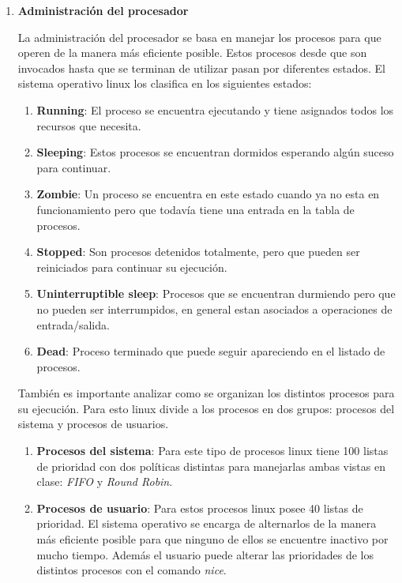 \documentclass[a4paper,11pt] {article}
\begin{document}
\begin{enumerate}
	\item \textbf{Administraci\'on del procesador}

		La administraci\'on del procesador se basa en manejar los procesos para que operen de la manera m\'as eficiente posible. Estos procesos desde que son invocados hasta que se terminan de utilizar pasan por diferentes estados. El sistema operativo linux los clasifica en los siguientes estados:

		\begin{enumerate}
			\item \textbf{Running}: El proceso se encuentra ejecutando y tiene asignados todos los recursos que necesita.
			\item \textbf{Sleeping}: Estos procesos se encuentran dormidos esperando alg\'un suceso para continuar.
			\item \textbf{Zombie}: Un proceso se encuentra en este estado cuando ya no esta en funcionamiento pero que todav\'ia tiene una entrada en la tabla de procesos.
			\item \textbf{Stopped}: Son procesos detenidos totalmente, pero que pueden ser reiniciados para continuar su ejecuci\'on.
			\item \textbf{Uninterruptible sleep}: Procesos que se encuentran durmiendo pero que no pueden ser interrumpidos, en general estan asociados a operaciones de entrada/salida.
			\item \textbf{Dead}: Proceso terminado que puede seguir apareciendo en el listado de procesos.
		\end{enumerate}

		Tambi\'en es importante analizar como se organizan los distintos procesos para su ejecuci\'on. Para esto linux divide a los procesos en dos grupos: procesos del sistema y procesos de usuarios.
		\begin{enumerate}
			\item \textbf{Procesos del sistema}: Para este tipo de procesos linux tiene 100 listas de prioridad con dos pol\'iticas distintas para manejarlas ambas vistas en clase: \textit{FIFO} y \textit{Round Robin}. 
			\item \textbf{Procesos de usuario}: Para estos procesos linux posee 40 listas de prioridad. El sistema operativo se encarga de alternarlos de la manera m\'as eficiente posible para que ninguno de ellos se encuentre inactivo por mucho tiempo. Adem\'as el usuario puede alterar las prioridades de los distintos procesos con el comando \textit{nice}.
		\end{enumerate}


\end{enumerate}
\end{document}
